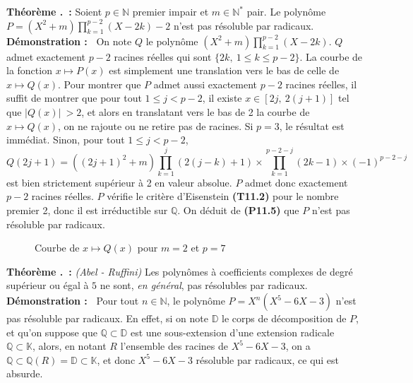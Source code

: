 \documentclass[5pt,a4paper]{article}
\newcounter{thm}[section]
\renewcommand{\thethm}{\thesection.\arabic{thm}}
\newcommand{\thm}[1]{\stepcounter{thm}\noindent\textbf{Théorème \thethm ~:} #1 \newline}
\newcommand{\demo}[1]{\textbf{Démonstration :~} #1 \newline}
\begin{document}
\begin{onehalfspacing}
\thm{Soient $p \in \mathbb{N}$ premier impair et $m \in \mathbb{N}^*$ pair. Le polynôme $P = (X^2 + m)\displaystyle{\prod_{k=1}^{p-2}} (X - 2k) - 2$ n'est pas résoluble par radicaux.}
\demo{On note $Q$ le polynôme $(X^2 + m)\displaystyle{\prod_{k=1}^{p-2}} (X - 2k)$. $Q$ admet exactement $p-2$ racines réelles qui sont $\{2k,~1 \leq k \leq p-2\}$. La courbe de la fonction $x \mapsto P(x)$ est simplement une translation vers le bas de celle de $x \mapsto Q(x)$. Pour montrer que $P$ admet aussi exactement $p-2$ racines réelles, il suffit de montrer que pour tout $1\leq j < p-2$, il existe $x \in [2j,~2(j+1)]$ tel que $\lvert Q(x) \lvert~ > 2$, et alors en translatant vers le bas de 2 la courbe de $x \mapsto Q(x)$, on ne rajoute ou ne retire pas de racines. Si $p = 3$, le résultat est immédiat. Sinon, pour tout $1\leq j < p-2$, 
\[ Q(2j+1) = ((2j+1)^2 + m)\prod_{k=1}^j (2(j-k) + 1) \times \prod_{k=1}^{p-2-j} (2k - 1) \times (-1)^{p-2-j}\]
est bien strictement supérieur à 2 en valeur absolue. $P$ admet donc exactement $p - 2$ racines réelles. $P$ vérifie le critère d'Eisenstein \textbf{(T11.2)} pour le nombre premier 2, donc il est irréductible sur $\mathbb{Q}$. On déduit de \textbf{(P11.5)} que $P$ n'est pas résoluble par radicaux.}

\begin{figure}[!h]
\centering
\caption{Courbe de $x \mapsto Q(x)$ pour $m = 2$ et $p = 7$}
\end{figure}


\thm{\textit{(Abel - Ruffini)} Les polynômes à coefficients complexes de degré supérieur ou égal à $5$ ne sont, \textit{en général}, pas résolubles par radicaux.}
\demo{Pour tout $n \in \mathbb{N}$, le polynôme $P = X^n(X^5 - 6X - 3)$ n'est pas résoluble par radicaux. En effet, si on note $\mathbb{D}$ le corps de décomposition de $P$, et qu'on suppose que $\mathbb{Q} \subset \mathbb{D}$ est une sous-extension d'une extension radicale $\mathbb{Q} \subset \mathbb{K}$, alors, en notant $R$ l'ensemble des racines de $X^5 - 6X - 3$, on a $\mathbb{Q} \subset \mathbb{Q}(R) = \mathbb{D} \subset \mathbb{K}$, et donc $X^5 - 6X - 3$ résoluble par radicaux, ce qui est absurde. }


\end{onehalfspacing}
\end{document}
